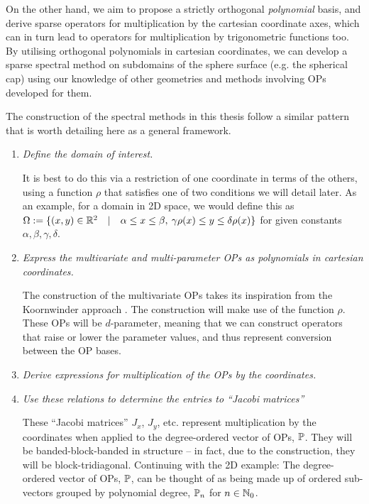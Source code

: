 On the other hand, we aim to propose a strictly orthogonal \textit{polynomial} basis, and derive sparse operators for multiplication by the cartesian coordinate axes, which can in turn lead to operators for multiplication by trigonometric functions too. By utilising orthogonal polynomials in cartesian coordinates, we can develop a sparse spectral method on subdomains of the sphere surface (e.g. the spherical cap) using our knowledge of other geometries and methods involving OPs developed for them.


The construction of the spectral methods in this thesis follow a similar pattern that is worth detailing here as a general framework.
\begin{enumerate}
	\item \textit{Define the domain of interest.}
	
		It is best to do this via a restriction of one coordinate in terms of the others, using a function $\rho$ that satisfies one of two conditions we will detail later. As an example, for a domain in 2D space, we would define this as $\Omega := \{ (x,y) \in \mathbb{R}^2 \quad | \quad \alpha \le x \le \beta, \: \gamma \rho(x) \le y \le \delta \rho(x) \}$ for given constants $\alpha, \beta, \gamma, \delta$.
	
	\item \textit{Express the multivariate and multi-parameter OPs as polynomials in cartesian coordinates.}
	
		The construction of the multivariate OPs takes its inspiration from the Koornwinder approach \cite{koornwinder1975two}. The construction will make use of the function $\rho$. These OPs will be $d$-parameter, meaning that we can construct operators that raise or lower the parameter values, and thus represent conversion between the OP bases.
	
	\item \textit{Derive expressions for multiplication of the OPs by the coordinates.}
	
	\item \textit{Use these relations to determine the entries to \enquote{Jacobi matrices}}
	
		These \enquote{Jacobi matrices} $J_x$, $J_y$, etc. represent multiplication by the coordinates when applied to the degree-ordered vector of OPs, $\mathbb{P}$. They will be banded-block-banded in structure -- in fact, due to the construction, they will be block-tridiagonal. Continuing with the 2D example:
		The degree-ordered vector of OPs, $\mathbb{P}$, can be thought of as being made up of ordered sub-vectors grouped by polynomial degree, $\mathbb{P}_n$ for $n \in \mathbb{N}_0$.
		

\end{enumerate}
